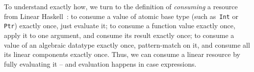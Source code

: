 \documentclass[acmsmall,review,anonymous,screen]{acmart}
\newcommand{\lolli}{\multimap}
\newcommand{\tensor}{\otimes}
\begin{document}
%
%
%
%
To understand exactly how,
we turn to the definition of \emph{consuming} a resource from Linear
Haskell~\cite{cite:linearhaskell}:
to consume a value of atomic base type (such as~\texttt{Int} or
        \texttt{Ptr}) exactly once, just evaluate it;
        to consume a function value exactly once, apply it to one argument,
        and consume its result exactly once;
        to consume a value of an algebraic datatype exactly once,
        pattern-match on it, and consume all its linear components exactly once.
Thus, we can consume a linear resource by fully evaluating it -- and evaluation
happens in case expressions.

\end{document}
